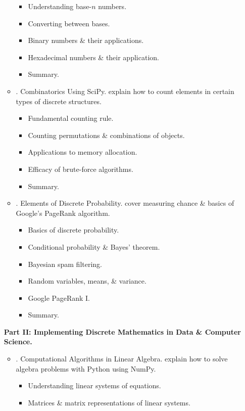 \documentclass{article}
\begin{document}
\begin{enumerate}
\begin{itemize}
		\begin{itemize}
			\item {\sf Understanding base-$n$ numbers.}
			\item {\sf Converting between bases.}
			\item {\sf Binary numbers \& their applications.}
			\item {\sf Hexadecimal numbers \& their application.}
			\item {\sf Summary.}
		\end{itemize}
		\item {. Combinatorics Using SciPy.} explain how to count elements in certain types of discrete structures.
		\begin{itemize}
			\item {\sf Fundamental counting rule.}
			\item {\sf Counting permutations \& combinations of objects.}
			\item {\sf Applications to memory allocation.}
			\item {\sf Efficacy of brute-force algorithms.}
			\item {\sf Summary.}
		\end{itemize}
		\item {. Elements of Discrete Probability.} cover measuring chance \& basics of Google's PageRank algorithm.
		\begin{itemize}
			\item {\sf Basics of discrete probability.}
			\item {\sf Conditional probability \& Bayes' theorem.}
			\item {\sf Bayesian spam filtering.}
			\item {\sf Random variables, means, \& variance.}
			\item {\sf Google PageRank I.}
			\item {\sf Summary.}
		\end{itemize}
	\end{itemize}
	{\bf Part II: Implementing Discrete Mathematics in Data \& Computer Science.}
	\begin{itemize}
		\item {. Computational Algorithms in Linear Algebra.} explain how to solve algebra problems with Python using NumPy.
		\begin{itemize}
			\item {\sf Understanding linear systems of equations.}
			\item {\sf Matrices \& matrix representations of linear systems.}

\end{itemize}
\end{itemize}
\end{enumerate}
\end{document}
